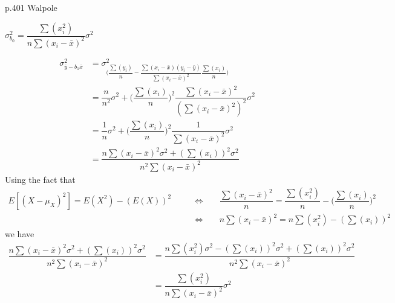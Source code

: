 \newpage
p.401 Walpole\\[2ex]
\begin{center}
    $\sigma_{b_{0}}^{2} = \dfrac{\sum(x_{i}^{2})}{n\sum(x_{i} - \bar{x})^{2}}\sigma^{2}$
\end{center}
\begin{align*}
    \sigma_{\bar{y} - b_{1}\bar{x}}^{2} &= \sigma_{\Big(\dfrac{\sum(y_{i})}{n} - \dfrac{\sum(x_{i} - \bar{x})(y_{i} - \bar{y})}{\sum(x_{i} - \bar{x})^{2}}\dfrac{\sum(x_{i})}{n}\Big)}^{2}\\[1ex]
    &= \dfrac{n}{n^{2}}\sigma^{2} + \Big(\dfrac{\sum(x_{i})}{n}\Big)^{2}\dfrac{\sum(x_{i} - \bar{x})^{2}}{(\sum(x_{i} - \bar{x})^{2})^{2}}\sigma^{2}\\[1ex]
    &= \dfrac{1}{n}\sigma^{2} + \Big(\dfrac{\sum(x_{i})}{n}\Big)^{2}\dfrac{1}{\sum(x_{i} - \bar{x})^{2}}\sigma^{2}\\[1ex]
    &= \dfrac{n\sum(x_{i} - \bar{x})^{2}\sigma^{2} + (\sum(x_{i}))^{2}\sigma^{2}}{n^{2}\sum(x_{i} - \bar{x})^{2}}
\end{align*}
Using the fact that
\begin{align*}
    E[(X - \mu_{X})^{2}] = E(X^{2}) - (E(X))^{2} \hspace{20pt} &\Longleftrightarrow \hspace{20pt} \dfrac{\sum(x_{i} - \bar{x})^{2}}{n} = \dfrac{\sum(x_{i}^{2})}{n} - \Big(\dfrac{\sum(x_{i})}{n}\Big)^{2}\\[1ex]
    &\Longleftrightarrow \hspace{20pt} n\sum(x_{i} - \bar{x})^{2} = n\sum(x_{i}^{2}) - (\sum(x_{i}))^{2}
\end{align*}
we have
\begin{align*}
    \dfrac{n\sum(x_{i} - \bar{x})^{2}\sigma^{2} + (\sum(x_{i}))^{2}\sigma^{2}}{n^{2}\sum(x_{i} - \bar{x})^{2}} &= \dfrac{n\sum(x_{i}^{2})\sigma^{2} - (\sum(x_{i}))^{2}\sigma^{2} + (\sum(x_{i}))^{2}\sigma^{2}}{n^{2}\sum(x_{i} - \bar{x})^{2}}\\[1ex]
    &= \dfrac{\sum(x_{i}^{2})}{n\sum(x_{i} - \bar{x})^{2}}\sigma^{2}
\end{align*}



